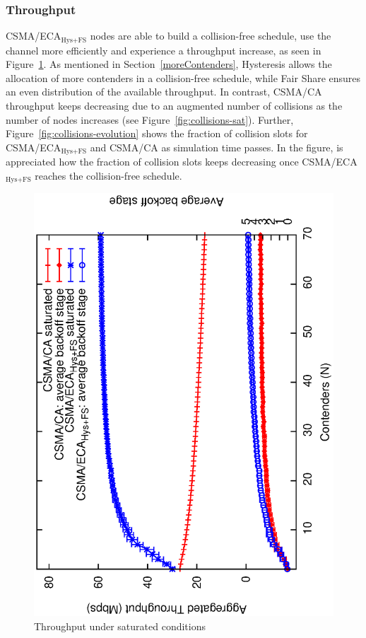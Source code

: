 \documentclass[a4paper,journal]{IEEEtran}
\begin{document}
	\subsubsection{Throughput}
	CSMA/ECA$_{\text{Hys+FS}}$ nodes are able to build a collision-free schedule, use the channel more efficiently and experience a throughput increase, as seen in Figure~\ref{fig:throughput-sat}. As mentioned in Section~\ref{moreContenders}, Hysteresis allows the allocation of more contenders in a collision-free schedule, while Fair Share ensures an even distribution of the available throughput. In contrast, CSMA/CA throughput keeps decreasing due to an augmented number of collisions as the number of nodes increases (see Figure~\ref{fig:collisions-sat}). Further, Figure~\ref{fig:collisions-evolution} shows the fraction of collision slots for CSMA/ECA$_{\text{Hys+FS}}$ and CSMA/CA as simulation time passes. In the figure, is appreciated how the fraction of collision slots keeps decreasing once CSMA/ECA$_{\text{Hys+FS}}$ reaches the collision-free schedule.
	
	\begin{figure}[tb]
	\centering
		\includegraphics[width=0.7\linewidth,angle=-90]{figures/saturated/throughput-saturated-w-BOS/throughput-saturated-w-BOS2.eps}
		\caption{Throughput under saturated conditions}
		\label{fig:throughput-sat}
	\end{figure}
	
\end{document}
